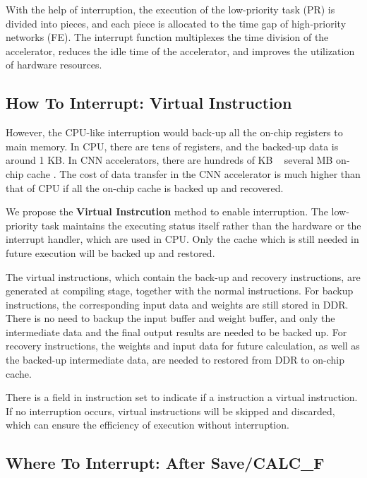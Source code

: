 With the help of interruption, the execution of the low-priority task (PR) is divided into pieces, and each piece is allocated to the time gap of high-priority networks (FE). The interrupt function multiplexes the time division of the accelerator, reduces the idle time of the accelerator, and improves the utilization of hardware resources. 

\subsection{How To Interrupt: Virtual Instruction}
\label{sec:howinter}


However, the CPU-like interruption would back-up all the on-chip registers to main memory. In CPU, there are tens of registers, and the backed-up data is around 1 KB. In CNN accelerators, there are hundreds of KB ~ several MB on-chip cache \cite{qiu2016going, yu2018instruction}. The cost of data transfer in the CNN accelerator is much higher than that of CPU if all the on-chip cache is backed up and recovered.

We propose the \textbf{Virtual Instrcution} method to enable interruption. The low-priority task maintains the executing status itself rather than the hardware or the interrupt handler, which are used in CPU. Only the cache which is still needed in future execution will be backed up and restored.

The virtual instructions, which contain the back-up and recovery instructions, are generated at compiling stage, together with the normal instructions. For backup instructions, the corresponding input data and weights are still stored in DDR. There is no need to backup the input buffer and weight buffer, and only the intermediate data and the final output results are needed to be backed up. For recovery instructions, the weights and input data for future calculation, as well as the backed-up intermediate data, are needed to restored from DDR to on-chip cache.

There is a field in instruction set to indicate if a instruction a virtual instruction. If no interruption occurs, virtual instructions will be skipped and discarded, which can ensure the efficiency of execution without interruption.

\subsection{ Where To Interrupt: After Save/CALC\_F }
\label{sec:whereinter}

